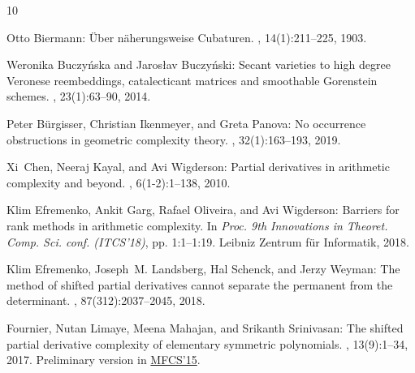 \documentclass[11pt]{article}
\numberwithin{equation}{section}
\theoremstyle{definition}
\theoremstyle{plain}
\begin{document}
\tocrefpdfbookmark
\begin{thebibliography}{10}

{\sc Otto Biermann}: {{\"U}ber n{\"a}herungsweise {C}ubaturen}.
, 14(1):211--225, 1903.
\newblock [\epfmtdoi{10.1007/BF01706869}]

{\sc Weronika Buczy{\'n}ska and Jaros{\l}av Buczy{\'n}ski}: {Secant varieties
  to high degree {V}eronese reembeddings, catalecticant matrices and smoothable
  {G}orenstein schemes}.
, 23(1):63--90, 2014.

{\sc Peter B{\"u}rgisser, Christian Ikenmeyer, and Greta Panova}: {No
  occurrence obstructions in geometric complexity theory}.
, 32(1):163--193, 2019.

{\sc Xi~Chen, Neeraj Kayal, and Avi Wigderson}: {Partial derivatives in
  arithmetic complexity and beyond}.
, 6(1-2):1--138, 2010.
\newblock [\epfmtdoi{10.1561/0400000043}]

{\sc Klim Efremenko, Ankit Garg, Rafael Oliveira, and Avi Wigderson}: Barriers
  for rank methods in arithmetic complexity.
\newblock In {\em Proc. 9th Innovations in Theoret. Comp. Sci. conf.
  (ITCS'18)}, pp. 1:1--1:19. Leibniz Zentrum f{\"u}r Informatik, 2018.

{\sc Klim Efremenko, Joseph~M. Landsberg, Hal Schenck, and Jerzy Weyman}: {The
  method of shifted partial derivatives cannot separate the permanent from the
  determinant}.
, 87(312):2037--2045, 2018.

{ Fournier, Nutan Limaye, Meena Mahajan, and Srikanth Srinivasan}:
  {The shifted partial derivative complexity of elementary symmetric
  polynomials}.
, 13(9):1--34, 2017.
\newblock Preliminary version in
  \href{https://link.springer.com/chapter/10.1007/978-3-662-48054-0_27}{MFCS'15}.


\end{thebibliography}
\end{document}
